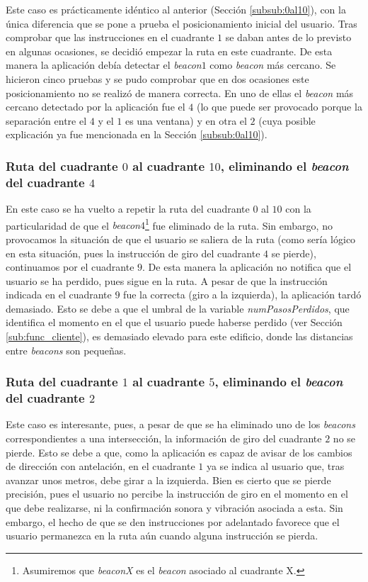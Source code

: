 Este caso es prácticamente idéntico al anterior (Sección \ref{subsub:0al10}), con la única diferencia que se pone a prueba el posicionamiento inicial del usuario. Tras comprobar que las instrucciones en el cuadrante $1$ se daban antes de lo previsto en algunas ocasiones, se decidió empezar la ruta en este cuadrante. De esta manera la aplicación debía detectar el \textit{beacon$1$} como \textit{beacon} más cercano. Se hicieron cinco pruebas y se pudo comprobar que en dos ocasiones este posicionamiento no se realizó de manera correcta. En uno de ellas el \textit{beacon} más cercano detectado por la aplicación fue el $4$ (lo que puede ser provocado porque la separación entre el $4$ y el $1$ es una ventana) y en otra el $2$ (cuya posible explicación  ya fue mencionada en la Sección \ref{subsub:0al10}).

\subsubsection{Ruta del cuadrante $0$ al cuadrante $10$, eliminando el \textit{beacon} del cuadrante $4$}
\label{subsub:0al10sin4}

En este caso se ha vuelto a repetir la ruta del cuadrante $0$ al $10$ con la particularidad de que el \textit{beacon$4$}\footnote{Asumiremos que \textit{beaconX} es el \textit{beacon} asociado al cuadrante X.} fue eliminado de la ruta. Sin embargo, no provocamos la situación de que el usuario se saliera de la ruta (como sería lógico en esta situación, pues la instrucción de giro del cuadrante $4$ se pierde), continuamos por el cuadrante $9$. De esta manera la aplicación no notifica que el usuario se ha perdido, pues sigue en la ruta. A pesar de que la instrucción indicada en el cuadrante $9$ fue la correcta (giro a la izquierda), la aplicación tardó demasiado. Esto se debe a que el umbral de la variable \textit{numPasosPerdidos}, que identifica el momento en el que el usuario puede haberse perdido (ver Sección \ref{sub:func_cliente}), es demasiado elevado para este edificio, donde las distancias entre \textit{beacons} son pequeñas.


\subsubsection{Ruta del cuadrante $1$ al cuadrante $5$, eliminando el \textit{beacon} del cuadrante $2$}
\label{subsub:1al5sin2}

Este caso es interesante, pues, a pesar de que se ha eliminado uno de los \textit{beacons} correspondientes a una intersección, la información de giro del cuadrante $2$ no se pierde. Esto se debe a que, como la aplicación es capaz de avisar de los cambios de dirección con antelación, en el cuadrante $1$ ya se indica al usuario que, tras avanzar unos metros, debe girar a la izquierda. Bien es cierto que se pierde precisión, pues el usuario no percibe la instrucción de giro en el momento en el que debe realizarse, ni la confirmación sonora y vibración asociada a esta. Sin embargo, el hecho de que se den instrucciones por adelantado favorece que el usuario permanezca en la ruta aún cuando alguna instrucción se pierda. 

